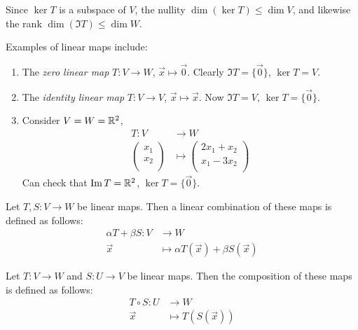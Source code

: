 \documentclass{../../template/note}
\begin{document}
    \begin{remark}
        Since \(\ker T\) is a subspace of \(V\), the nullity \(\dim(\ker T) \leq \dim V\), and likewise the rank \(\dim(\Im T) \leq \dim W\).
    \end{remark}
    
    \begin{example}
        Examples of linear maps include:
        \begin{enumerate}[label=\protect\circled{\arabic*}]
            \item The \emph{zero linear map} \(T: V \to W\), \(\vec x \mapsto \vec 0\). Clearly \(\Im T = \{\vec 0\}\), \(\ker T = V\).
            \item The \emph{identity linear map} \(T: V \to V\), \(\vec x \mapsto \vec x\). Now \(\Im T = V\), \(\ker T = \{\vec 0\}\).
            \item Consider \(V = W = \mathbb R^2\),
            \begin{align*}
                T: V &\to W \\
                \begin{pmatrix}
                 x_1 \\
                 x_2 \\
                \end{pmatrix} &\mapsto
                \begin{pmatrix}
                 2x_1 + x_2 \\
                 x_1 - 3x_2 \\
                \end{pmatrix}
            \end{align*}
            Can check that \(\operatorname{Im} T = \mathbb R^2\), \(\ker T = \{\vec 0\}\).            
        \end{enumerate}
    \end{example}

    \begin{definition}
        Let \(T, S: V \to W\) be linear maps. Then a linear combination of these maps is defined as follows:
        \begin{align*}
            \alpha T + \beta S: V &\to W \\
            \vec x &\mapsto \alpha T(\vec x) + \beta S(\vec x)
        \end{align*}
    \end{definition}
    
    \begin{definition}
        Let \(T: V \to W\) and \(S: U \to V\) be linear maps. Then the composition of these maps is defined as follows:
        \begin{align*}
            T \circ S: U &\to W \\
            \vec x &\mapsto T(S(\vec x))
        \end{align*}
    \end{definition}
    
\end{document}
